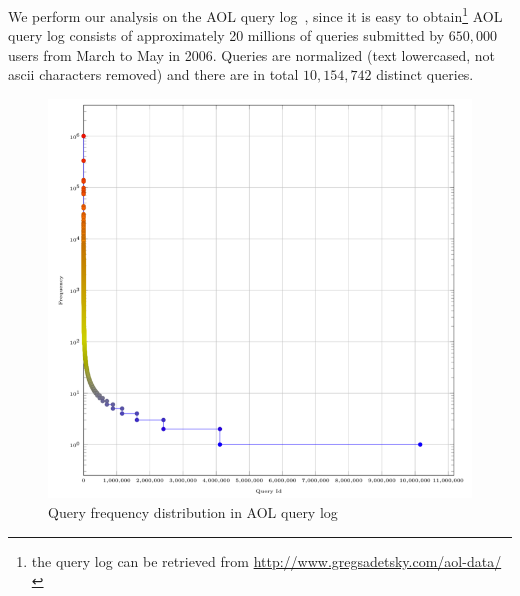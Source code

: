 We perform our analysis on the AOL query log~\cite{pass2006picture}, since it is easy to obtain\footnote{the query log can be retrieved from \url{http://www.gregsadetsky.com/aol-data/}}
AOL query log consists of approximately 20 millions of queries submitted by $650,000$ users from March to May in 2006. Queries are normalized (text lowercased, not ascii characters removed) and 
there are in total $10,154,742$ distinct queries. 

\begin{figure}
	\centering
	\includegraphics[scale=0.28]{images/aol}
	\caption{Query frequency distribution in AOL query log}
\end{figure}